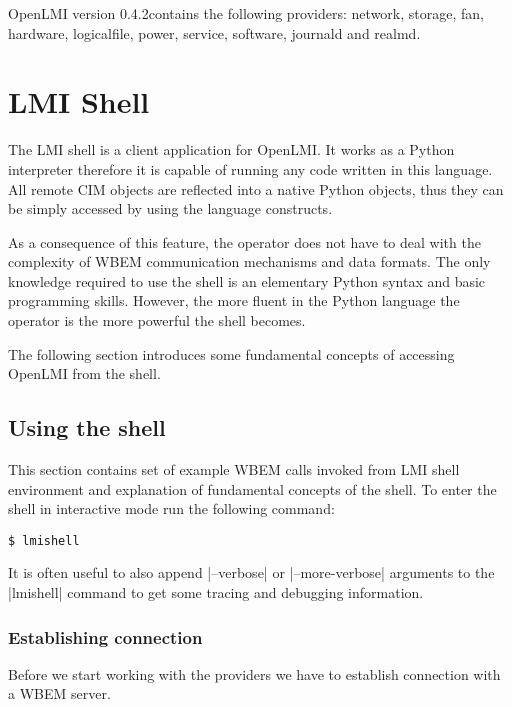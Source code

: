 OpenLMI version 0.4.2\footnotemark contains the following providers: network,
storage, fan, hardware, logicalfile, power, service, software, journald and
realmd.


\section{LMI Shell}
\label{openlmi:shell}

The LMI shell is a client application for OpenLMI. It works as a Python
interpreter therefore it is capable of running any code written in this
language. All remote CIM objects are reflected into a native Python objects,
thus they can be simply accessed by using the language constructs.

As a consequence of this feature, the operator does not have to deal with the
complexity of WBEM communication mechanisms and data formats. The only knowledge
required to use the shell is an elementary Python syntax and basic programming
skills. However, the more fluent in the Python language the operator is the more
powerful the shell becomes.

The following section introduces some fundamental concepts of accessing OpenLMI
from the shell.

\subsection{Using the shell}
\label{openlmi:shell:examples}

This section contains set of example WBEM calls invoked from LMI shell
environment and explanation of fundamental concepts of the shell. To enter the
shell in interactive mode run the following command:

\begin{lstlisting}[numbers=none]
$ lmishell
\end{lstlisting}
\funclistend
It is often useful to also append |--verbose| or |--more-verbose| arguments to
the |lmishell| command to get some tracing and debugging information.

\subsubsection{Establishing connection}
\label{openlmi:shell:examples:connection}

Before we start working with the providers we have to establish connection
with a WBEM server.


